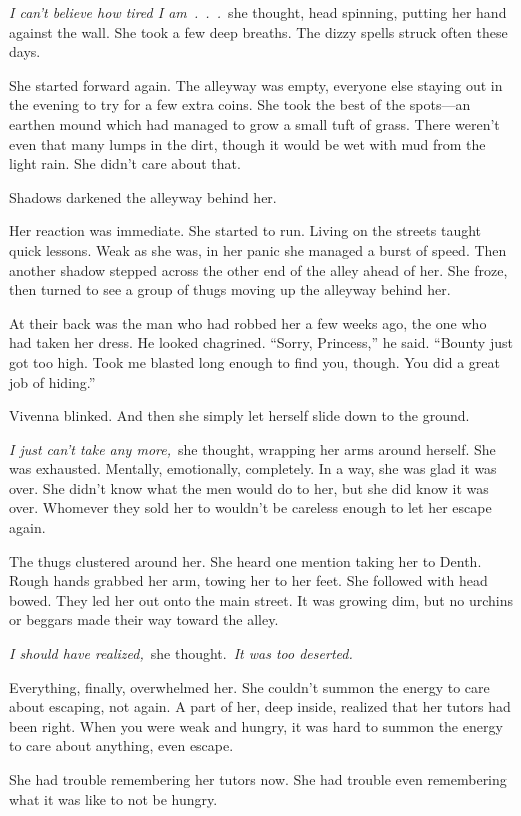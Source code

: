 \textit{I can’t believe how tired I am~.~.~.}~she thought, head spinning, putting her hand against the wall. She took a few deep breaths. The dizzy spells struck often these days.

She started forward again. The alleyway was empty, everyone else staying out in the evening to try for a few extra coins. She took the best of the spots—an earthen mound which had managed to grow a small tuft of grass. There weren’t even that many lumps in the dirt, though it would be wet with mud from the light rain. She didn’t care about that.

Shadows darkened the alleyway behind her.

Her reaction was immediate. She started to run. Living on the streets taught quick lessons. Weak as she was, in her panic she managed a burst of speed. Then another shadow stepped across the other end of the alley ahead of her. She froze, then turned to see a group of thugs moving up the alleyway behind her.

At their back was the man who had robbed her a few weeks ago, the one who had taken her dress. He looked chagrined. “Sorry, Princess,” he said. “Bounty just got too high. Took me blasted long enough to find you, though. You did a great job of hiding.”

Vivenna blinked. And then she simply let herself slide down to the ground.

\textit{I just can’t take any more,}~she thought, wrapping her arms around herself. She was exhausted. Mentally, emotionally, completely. In a way, she was glad it was over. She didn’t know what the men would do to her, but she did know it was over. Whomever they sold her to wouldn’t be careless enough to let her escape again.

The thugs clustered around her. She heard one mention taking her to Denth. Rough hands grabbed her arm, towing her to her feet. She followed with head bowed. They led her out onto the main street. It was growing dim, but no urchins or beggars made their way toward the alley.

\textit{I should have realized,}~she thought.~\textit{It was too deserted.}

Everything, finally, overwhelmed her. She couldn’t summon the energy to care about escaping, not again. A part of her, deep inside, realized that her tutors had been right. When you were weak and hungry, it was hard to summon the energy to care about anything, even escape.

She had trouble remembering her tutors now. She had trouble even remembering what it was like to not be hungry.

